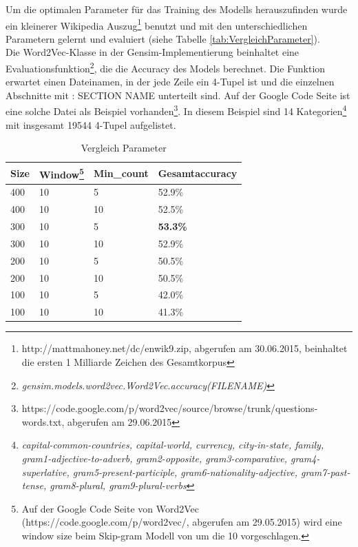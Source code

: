 \documentclass[12pt,a4paper]{report}
\begin{document}
Um die optimalen Parameter für das Training des Modells herauszufinden wurde ein kleinerer Wikipedia Auszug\footnote{http://mattmahoney.net/dc/enwik9.zip, abgerufen am 30.06.2015, beinhaltet die ersten 1 Milliarde Zeichen des Gesamtkorpus} benutzt und mit den unterschiedlichen Parametern gelernt und evaluiert (siehe Tabelle \ref{tab:VergleichParameter}).\\
Die Word2Vec-Klasse in der Gensim-Implementierung beinhaltet eine Evaluationsfunktion\footnote{\textit{gensim.models.word2vec.Word2Vec.accuracy(FILENAME)}}, die die Accuracy des Models berechnet. Die Funktion erwartet einen Dateinamen, in der jede Zeile ein 4-Tupel ist und die einzelnen Abschnitte mit \glqq : SECTION NAME\grqq{} unterteilt sind. Auf der Google Code Seite ist eine solche Datei als Beispiel vorhanden\footnote{https://code.google.com/p/word2vec/source/browse/trunk/questions-words.txt, abgerufen am 29.06.2015}. In diesem Beispiel sind 14 Kategorien\footnote{\textit{capital-common-countries, capital-world, currency, city-in-state, family, gram1-adjective-to-adverb, gram2-opposite, gram3-comparative, gram4-superlative, gram5-present-participle, gram6-nationality-adjective, gram7-past-tense, gram8-plural, gram9-plural-verbs}} mit insgesamt 19544 4-Tupel aufgelistet.\\

\begin{table}[h]
\caption{Vergleich Parameter}
\begin{center}
\begin{tabular}{l|l|l|l}\\
\textbf{Size} & \textbf{Window\footnote{Auf der Google Code Seite von Word2Vec (https://code.google.com/p/word2vec/, abgerufen am 29.05.2015) wird eine window size beim Skip-gram Modell von um die 10 vorgeschlagen.}} & \textbf{Min\_count} & \textbf{Gesamtaccuracy}\\
\hline	
400 & 10 &  5 & 52.9\%\\
400 & 10 & 10 & 52.5\%\\
300 & 10 &  5 & \textbf{53.3\%}\\
300 & 10 & 10 & 52.9\%\\
200 & 10 &  5 & 50.5\%\\
200 & 10 & 10 & 50.5\%\\
100 & 10 &  5 & 42.0\%\\
100 & 10 & 10 & 41.3\%\\

\end{tabular}
\end{center}
\end{table}
\end{document}
